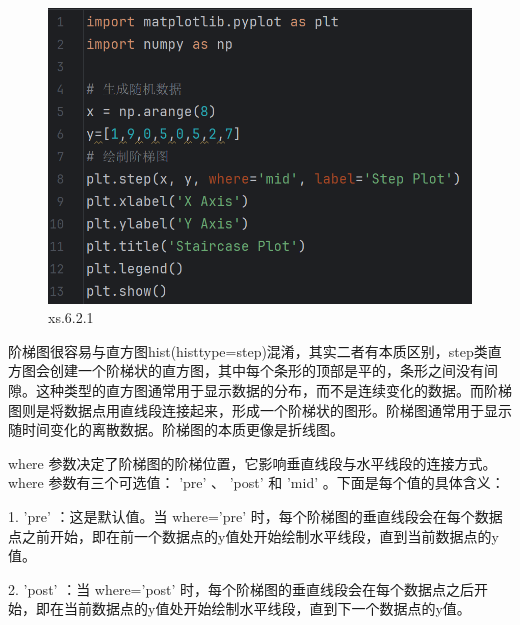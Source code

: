 \documentclass[12pt]{article}
\begin{document}
\begin{figure}[H]
    \centering
    \includegraphics[width=\linewidth]{阶梯图 program1.png}
    \caption{xs.6.2.1}
    \label{fig:enter-label}
\end{figure}
阶梯图很容易与直方图hist(histtype=step)混淆，其实二者有本质区别，step类直方图会创建一个阶梯状的直方图，其中每个条形的顶部是平的，条形之间没有间隙。这种类型的直方图通常用于显示数据的分布，而不是连续变化的数据。而阶梯图则是将数据点用直线段连接起来，形成一个阶梯状的图形。阶梯图通常用于显示随时间变化的离散数据。阶梯图的本质更像是折线图。

where  参数决定了阶梯图的阶梯位置，它影响垂直线段与水平线段的连接方式。  where  参数有三个可选值：  'pre'  、  'post'  和  'mid'  。下面是每个值的具体含义：

1.   'pre'  ：这是默认值。当  where='pre'  时，每个阶梯图的垂直线段会在每个数据点之前开始，即在前一个数据点的y值处开始绘制水平线段，直到当前数据点的y值。

2.   'post'  ：当  where='post'  时，每个阶梯图的垂直线段会在每个数据点之后开始，即在当前数据点的y值处开始绘制水平线段，直到下一个数据点的y值。
\end{document}
